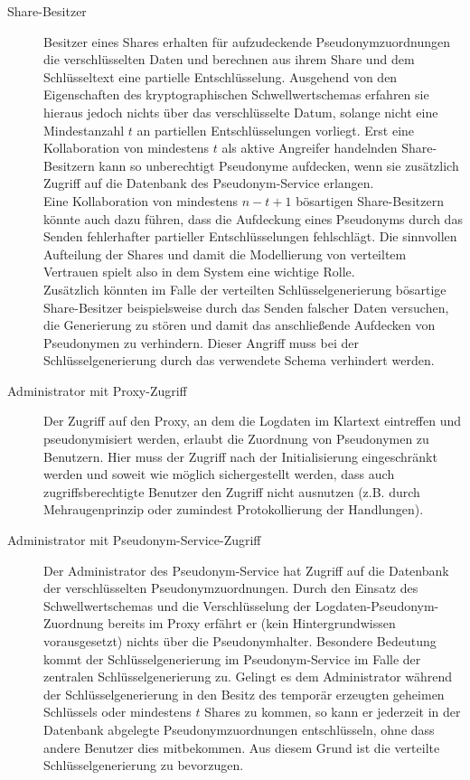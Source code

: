 \begin{description}
  \item[Share-Besitzer] Besitzer eines Shares erhalten für aufzudeckende Pseudonymzuordnungen die verschlüsselten Daten und berechnen aus ihrem Share und dem Schlüsseltext eine partielle Entschlüsselung. Ausgehend von den Eigenschaften des kryptographischen Schwellwertschemas erfahren sie hieraus jedoch nichts über das verschlüsselte Datum, solange nicht eine Mindestanzahl \(t\) an partiellen Entschlüsselungen vorliegt. Erst eine Kollaboration von mindestens \(t\) als aktive Angreifer handelnden Share-Besitzern kann so unberechtigt Pseudonyme aufdecken, wenn sie zusätzlich Zugriff auf die Datenbank des Pseudonym-Service erlangen. \\
  Eine Kollaboration von mindestens \(n-t+1\) bösartigen Share-Besitzern könnte auch dazu führen, dass die Aufdeckung eines Pseudonyms durch das Senden fehlerhafter partieller Entschlüsselungen fehlschlägt. Die sinnvollen Aufteilung der Shares und damit die Modellierung von verteiltem Vertrauen spielt also in dem System eine wichtige Rolle.\\
  Zusätzlich könnten im Falle der verteilten Schlüsselgenerierung bösartige Share-Besitzer beispielsweise durch das Senden falscher Daten versuchen, die Generierung zu stören und damit das anschließende Aufdecken von Pseudonymen zu verhindern. Dieser Angriff muss bei der Schlüsselgenerierung durch das verwendete Schema verhindert werden.
  
  \item[Administrator mit Proxy-Zugriff] Der Zugriff auf den Proxy, an dem die Logdaten im Klartext eintreffen und pseudonymisiert werden, erlaubt die Zuordnung von Pseudonymen zu Benutzern. Hier muss der Zugriff nach der Initialisierung eingeschränkt werden und soweit wie möglich sichergestellt werden, dass auch zugriffsberechtigte Benutzer den Zugriff nicht ausnutzen (z.B. durch Mehraugenprinzip oder zumindest Protokollierung der Handlungen).
  
  \item[Administrator mit Pseudonym-Service-Zugriff] Der Administrator des Pseudonym-Service hat Zugriff auf die Datenbank der verschlüsselten Pseudonymzuordnungen. Durch den Einsatz des Schwellwertschemas und die Verschlüsselung der Logdaten-Pseudonym-Zuordnung bereits im Proxy erfährt er (kein Hintergrundwissen vorausgesetzt) nichts über die Pseudonymhalter. Besondere Bedeutung kommt der Schlüsselgenerierung im Pseudonym-Service im Falle der zentralen Schlüsselgenerierung zu. Gelingt es dem Administrator während der Schlüsselgenerierung in den Besitz des temporär erzeugten geheimen Schlüssels oder mindestens \(t\) Shares zu kommen, so kann er jederzeit in der Datenbank abgelegte Pseudonymzuordnungen entschlüsseln, ohne dass andere Benutzer dies mitbekommen. Aus diesem Grund ist die verteilte Schlüsselgenerierung zu bevorzugen.
\end{description}